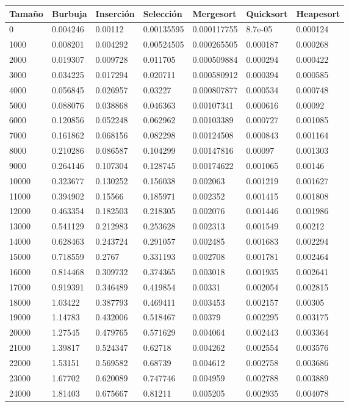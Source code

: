 \begin{tabular}[H]{|lllllll|}
\hline
\textbf{Tamaño} & \textbf{Burbuja} & \textbf{Inserción} & \textbf{Selección} & \textbf{Mergesort} & \textbf{Quicksort} & \textbf{Heapesort} \\ \hline
0 & 0.004246 & 0.00112 & 0.00135595 & 0.000117755 & 8.7e-05 & 0.000124 \\ \hline
1000 & 0.008201 & 0.004292 & 0.00524505 & 0.000265505 & 0.000187 & 0.000268 \\ \hline
2000 & 0.019307 & 0.009728 & 0.011705 & 0.000509884 & 0.000294 & 0.000422 \\ \hline
3000 & 0.034225 & 0.017294 & 0.020711 & 0.000580912 & 0.000394 & 0.000585 \\ \hline
4000 & 0.056845 & 0.026957 & 0.03227 & 0.000807877 & 0.000534 & 0.000748 \\ \hline
5000 & 0.088076 & 0.038868 & 0.046363 & 0.00107341 & 0.000616 & 0.00092 \\ \hline
6000 & 0.120856 & 0.052248 & 0.062962 & 0.00103389 & 0.000727 & 0.001085 \\ \hline
7000 & 0.161862 & 0.068156 & 0.082298 & 0.00124508 & 0.000843 & 0.001164 \\ \hline
8000 & 0.210286 & 0.086587 & 0.104299 & 0.00147816 & 0.00097 & 0.001303 \\ \hline
9000 & 0.264146 & 0.107304 & 0.128745 & 0.00174622 & 0.001065 & 0.00146 \\ \hline
10000 & 0.323677 & 0.130252 & 0.156038 & 0.002063 & 0.001219 & 0.001627 \\ \hline
11000 & 0.394902 & 0.15566 & 0.185971 & 0.002352 & 0.001415 & 0.001808 \\ \hline
12000 & 0.463354 & 0.182503 & 0.218305 & 0.002076 & 0.001446 & 0.001986 \\ \hline
13000 & 0.541129 & 0.212983 & 0.253628 & 0.002313 & 0.001549 & 0.00212 \\ \hline
14000 & 0.628463 & 0.243724 & 0.291057 & 0.002485 & 0.001683 & 0.002294 \\ \hline
15000 & 0.718559 & 0.2767 & 0.331193 & 0.002708 & 0.001781 & 0.002464 \\ \hline
16000 & 0.814468 & 0.309732 & 0.374365 & 0.003018 & 0.001935 & 0.002641 \\ \hline
17000 & 0.919391 & 0.346489 & 0.419854 & 0.00331 & 0.002054 & 0.002815 \\ \hline
18000 & 1.03422 & 0.387793 & 0.469411 & 0.003453 & 0.002157 & 0.00305 \\ \hline
19000 & 1.14783 & 0.432006 & 0.518467 & 0.00379 & 0.002295 & 0.003175 \\ \hline
20000 & 1.27545 & 0.479765 & 0.571629 & 0.004064 & 0.002443 & 0.003364 \\ \hline
21000 & 1.39817 & 0.524347 & 0.62718 & 0.004262 & 0.002554 & 0.003576 \\ \hline
22000 & 1.53151 & 0.569582 & 0.68739 & 0.004612 & 0.002758 & 0.003686 \\ \hline
23000 & 1.67702 & 0.620089 & 0.747746 & 0.004959 & 0.002788 & 0.003889 \\ \hline
24000 & 1.81403 & 0.675667 & 0.81211 & 0.005205 & 0.002935 & 0.004078 \\ \hline

\end{tabular}
